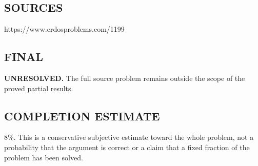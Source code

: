 \subsection*{SOURCES}
https://www.erdosproblems.com/1199

\subsection*{FINAL}
\textbf{UNRESOLVED.} The full source problem remains outside the scope of the proved partial results.

\subsection*{COMPLETION ESTIMATE}
$8\%$. This is a conservative subjective estimate toward the whole problem, not a probability that the argument is correct or a claim that a fixed fraction of the problem has been solved.
